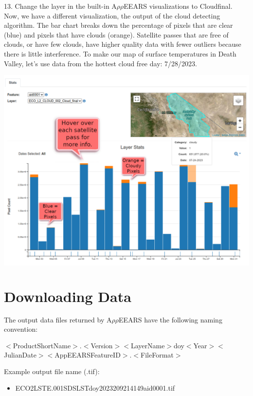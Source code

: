 \documentclass[oneside,a4paper,11pt,explicit]{book}
\begin{document}
13. Change the layer in the built-in A$\rho\rho$EEARS visualizations to Cloud\textunderscore final. Now, we have a different visualization, the output of the cloud detecting algorithm. The bar chart breaks down the percentage of pixels that are clear (blue) and pixels that have clouds (orange). Satellite passes that are free of clouds, or have few clouds, have higher quality data with fewer outliers because there is little interference. To make our map of surface temperatures in Death Valley, let's use data from the hottest cloud free day: 7/28/2023. 

\centerline{\includegraphics[width=\textwidth]{ExploreClouds.png}}

\section{Downloading Data}

The output data files returned by A$\rho\rho$EEARS have the following naming convention:  

\vspace{.5em}

\small{$<$ProductShortName$>$.$<$Version$>$\textunderscore $<$LayerName$>$\textunderscore doy$<$Year$>$$<$JulianDate$>$\textunderscore $<$AppEEARSFeatureID$>$.$<$FileFormat$>$}

\vspace{.5em}

Example output file name (.tif): 
\begin{itemize}
	\item ECO2LSTE.001\textunderscore SDS\textunderscore LST\textunderscore doy2023209214149\textunderscore aid0001.tif 
\end{itemize}
\end{document}
